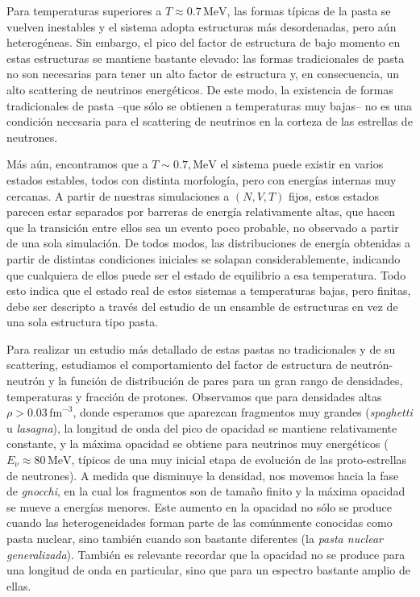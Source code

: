 Para temperaturas superiores a $T\approx0.7\,\text{MeV}$, las formas típicas de la pasta se vuelven inestables y el sistema adopta estructuras más desordenadas, pero aún heterogéneas.
Sin embargo, el pico del factor de estructura de bajo momento en estas estructuras se mantiene bastante elevado: las formas tradicionales de pasta no son necesarias para tener un alto factor de estructura y, en consecuencia, un alto scattering de neutrinos energéticos.
De este modo, la existencia de formas tradicionales de pasta --que sólo se obtienen a temperaturas muy bajas-- no es una condición necesaria para el scattering de neutrinos en la corteza de las estrellas de neutrones.

Más aún, encontramos que a $T\sim0.7,\text{MeV}$ el sistema puede existir en varios estados estables, todos con distinta morfología, pero con energías internas muy cercanas.
A partir de nuestras simulaciones a $(N,V,T)$ fijos, estos estados parecen estar separados por barreras de energía relativamente altas, que hacen que la transición entre ellos sea un evento poco probable, no observado a partir de una sola simulación.
De todos modos, las distribuciones de energía obtenidas a partir de distintas condiciones iniciales se solapan considerablemente, indicando que cualquiera de ellos puede ser el estado de equilibrio a esa temperatura.
Todo esto indica que el estado real de estos sistemas a temperaturas bajas, pero finitas, debe ser descripto a través del estudio de un ensamble de estructuras en vez de una sola estructura tipo pasta.


Para realizar un estudio más detallado de estas pastas no tradicionales y de su scattering, estudiamos el comportamiento del factor de estructura de neutrón-neutrón y la función de distribución de pares para un gran rango de densidades, temperaturas y fracción de protones.
Observamos que para densidades altas $\rho>0.03\,\text{fm}^{-3}$, donde esperamos que aparezcan fragmentos muy grandes (\emph{spaghetti} u \emph{lasagna}), la longitud de onda del pico de opacidad se mantiene relativamente constante, y la máxima opacidad se obtiene para neutrinos muy energéticos ($E_\nu \approx 80\,\text{MeV}$, típicos de una muy inicial etapa de evolución de las proto-estrellas de neutrones).
A medida que disminuye la densidad, nos movemos hacia la fase de \emph{gnocchi}, en la cual los fragmentos son de tamaño finito y la máxima opacidad se mueve a energías menores.
Este aumento en la opacidad no sólo se produce cuando las heterogeneidades forman parte de las comúnmente conocidas como pasta nuclear, sino también cuando son bastante diferentes (la \emph{pasta nuclear generalizada}).
También es relevante recordar que la opacidad no se produce para una longitud de onda en particular, sino que para un espectro bastante amplio de ellas.

